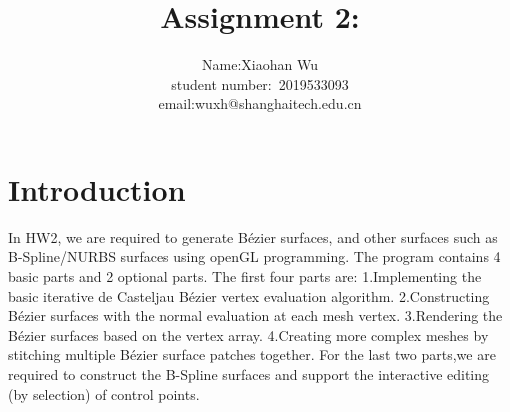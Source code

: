 \documentclass[acmtog]{acmart}
\title{Assignment 2:\\ {}}
\author{Name:\quad Xiaohan Wu  \\ student number:\ 2019533093
\\email:\quad wuxh@shanghaitech.edu.cn}
\begin{document}
\maketitle

\vspace*{2 ex}

\section{Introduction}
\qquad In HW2, we are required to generate Bézier surfaces, and other surfaces such as B-Spline/NURBS surfaces using openGL programming. The program contains 4 basic parts and 2 optional parts. The first four parts are: 1.Implementing the basic iterative de Casteljau Bézier vertex evaluation algorithm.
2.Constructing Bézier surfaces with the normal evaluation at each mesh vertex.
3.Rendering the Bézier surfaces based on the vertex array.
4.Creating more complex meshes by stitching multiple Bézier surface patches together.
For the last two parts,we are required to  construct the B-Spline surfaces and support the interactive editing (by selection) of control points.
\end{document}
